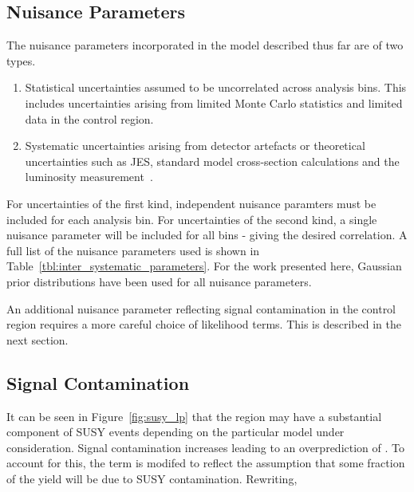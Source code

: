 \subsection{Nuisance Parameters}
The nuisance parameters incorporated in the model described thus far are of two
types.
\begin{enumerate}
\item Statistical uncertainties assumed to be uncorrelated across analysis
  bins. This includes uncertainties arising from limited Monte Carlo statistics
  and limited data in the control region.
\item Systematic uncertainties arising from detector artefacts or theoretical
  uncertainties such as \ac{JES}, standard model cross-section
  calculations and the luminosity measurement~\cite{cms_lumi_measurement}.
\end{enumerate}
For uncertainties of the first kind, independent nuisance paramters must be
included for each analysis bin. For uncertainties of the second kind, a single
nuisance parameter will be included for all bins - giving the desired
correlation. A full list of the nuisance parameters used is shown in
Table~\ref{tbl:inter_systematic_parameters}. For the work presented here,
Gaussian prior distributions have been used for all nuisance parameters.



An additional nuisance parameter reflecting signal contamination in the control
region requires a more careful choice of likelihood terms. This is described in
the next section.

\subsection{Signal Contamination}
It can be seen in Figure~\ref{fig:susy_lp} that the region \LPcontrol may have a
substantial component of \ac{SUSY} events depending on the particular model
under consideration. Signal contamination increases \NControl leading to an
overprediction of \NBkg. To account for this, the \NBkgi term is modifed to
reflect the assumption that some fraction of the yield \NControli will be due to
\ac{SUSY} contamination. Rewriting,

